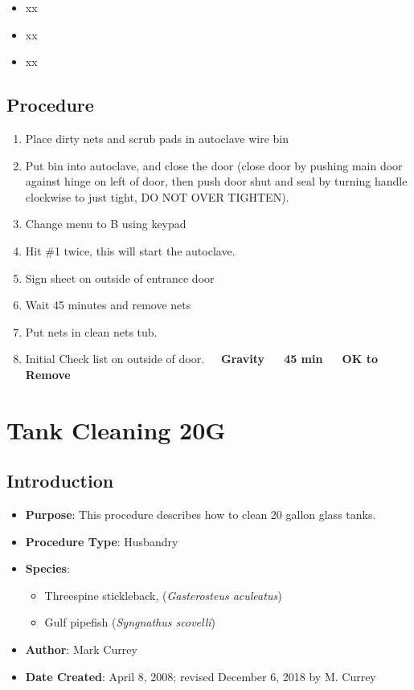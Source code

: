 \documentclass[
  letterpaper,
  DIV=11,
  numbers=noendperiod]{scrreprt}
\providecommand{\tightlist}{%
  \setlength{\itemsep}{0pt}\setlength{\parskip}{0pt}}\usepackage{longtable,booktabs,array}
\begin{document}
\begin{itemize}
\tightlist
\item
  xx
\item
  xx
\item
  xx
\end{itemize}

\hypertarget{procedure-6}{%
\section{Procedure}\label{procedure-6}}

\begin{enumerate}
\def\labelenumi{\arabic{enumi}.}
\tightlist
\item
  Place dirty nets and scrub pads in autoclave wire bin
\item
  Put bin into autoclave, and close the door (close door by pushing main
  door against hinge on left of door, then push door shut and seal by
  turning handle clockwise to just tight, DO NOT OVER TIGHTEN).
\item
  Change menu to B using keypad
\item
  Hit \#1 twice, this will start the autoclave.
\item
  Sign sheet on outside of entrance door
\item
  Wait 45 minutes and remove nets
\item
  Put nets in clean nets tub.
\item
  Initial Check list on outside of door.~~~\textbf{Gravity~~~45 min~~~OK
  to Remove}
\end{enumerate}

\hypertarget{sec-20gal_tank_cleaning-xxx}{%
\chapter{Tank Cleaning 20G}\label{sec-20gal_tank_cleaning-xxx}}

\hypertarget{introduction-7}{%
\section{Introduction}\label{introduction-7}}

\begin{itemize}
\tightlist
\item
  \textbf{Purpose}: This procedure describes how to clean 20 gallon
  glass tanks.
\item
  \textbf{Procedure Type}: Husbandry
\item
  \textbf{Species}:

  \begin{itemize}
  \tightlist
  \item
    Threespine stickleback, (\emph{Gasterosteus aculeatus})
  \item
    Gulf pipefish (\emph{Syngnathus scovelli})
  \end{itemize}
\item
  \textbf{Author}: Mark Currey
\item
  \textbf{Date Created}: April 8, 2008; revised December 6, 2018 by M.
  Currey
\end{itemize}
\end{document}
